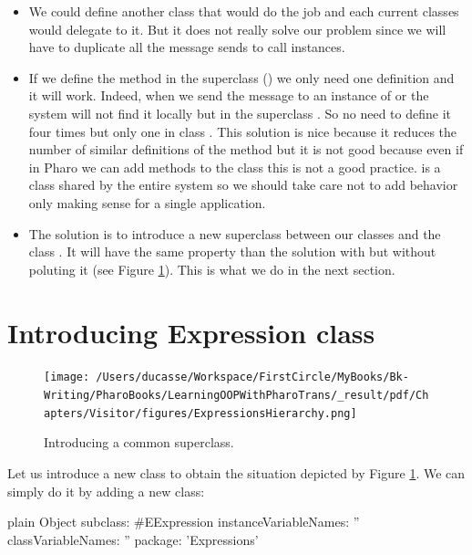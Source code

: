 \documentclass[10pt,twoside,english]{_support/latex/sbabook/sbabook}
\begin{document}
\begin{itemize}
\item We could define another class  that would do the job and each current classes would delegate to it. But it does not really solve our problem since we will have to duplicate all the message sends to call  instances. 
\item If we  define the method  in the superclass () we only need one definition and it will work. Indeed, when we send the message  to an instance of  or  the system will not find it locally but in the superclass . So no need to define it four times but only one in class . This solution is nice because it reduces the number of  similar definitions of the method  but it is not good because even if in Pharo we can add methods to the class  this is not a good practice.  is a class shared by the entire system so we should take care not to add behavior only making sense for a single application. 
\item The solution is to introduce a new superclass between our classes and the class . It will have the same property than the solution with  but without poluting it (see Figure \ref{figExpressionHierar}). This is what we do in the next section. 
\end{itemize}
\section{Introducing Expression class}

\begin{figure}

\begin{center}
\texttt{[image: /Users/ducasse/Workspace/FirstCircle/MyBooks/Bk-Writing/PharoBooks/LearningOOPWithPharoTrans/\_result/pdf/Chapters/Visitor/figures/ExpressionsHierarchy.png]}\caption{Introducing a common superclass.\label{figExpressionHierar}}\end{center}
\end{figure}


Let us introduce a new class to obtain the situation depicted by Figure \ref{figExpressionHierar}. 
We can simply do it by adding a new class:

\begin{displaycode}{plain}
Object subclass: #EExpression
	instanceVariableNames: ''
	classVariableNames: ''
	package: 'Expressions'
\end{displaycode}
\end{document}
